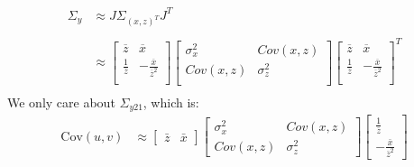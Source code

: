 \documentclass[11pt]{article}
\begin{document}
\begin{enumerate}
\begin{enumerate}[(i)]
                    \begin{align*}
                        \Sigma_y & \approx J \Sigma_{(x,z)^T} J^T                                                                                                  \\                                                                                                \\
                                 & \approx \begin{bmatrix}
                                               \overline{z}           & \overline{x}                         \\
                                               \frac{1}{\overline{z}} & -\frac{\overline{x}}{\overline{z}^2} \\
                                           \end{bmatrix} \begin{bmatrix}
                                                             \sigma_x^2 & Cov(x,z)   \\
                                                             Cov(x,z)   & \sigma_z^2 \\
                                                         \end{bmatrix} \begin{bmatrix}
                                                                           \overline{z}           & \overline{x}                         \\
                                                                           \frac{1}{\overline{z}} & -\frac{\overline{x}}{\overline{z}^2} \\
                                                                       \end{bmatrix}^T \\
                    \end{align*}
                    We only care about $\Sigma_{y 21}$, which is:
                    \[\begin{align*}
                            \text{Cov}(u, v) & \approx \begin{bmatrix} \bar{z} & \bar{x} \end{bmatrix}
                            \begin{bmatrix} \sigma_x^2 & Cov(x,z) \\ Cov(x,z) & \sigma_z^2 \end{bmatrix}
                            \begin{bmatrix} \frac{1}{\bar{z}} \\ -\frac{\bar{x}}{\bar{z}^2} \end{bmatrix}                                                                                \\

\end{align*}\]
\end{enumerate}
\end{enumerate}
\end{document}
